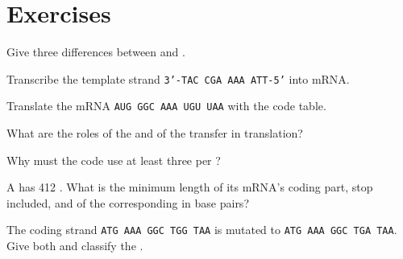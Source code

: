 \section{Exercises}

\begin{exercise}[$\star$]\label{exo:g11:gene-expression:1}
Give three differences between  and .
\end{exercise}

\begin{exercise}[$\star$]\label{exo:g11:gene-expression:2}
Transcribe the template strand \texttt{3'-TAC CGA AAA ATT-5'} into
mRNA.
\end{exercise}

\begin{exercise}[$\star$]\label{exo:g11:gene-expression:3}
Translate the mRNA \texttt{AUG GGC AAA UGU UAA} with the code table.
\end{exercise}

\begin{exercise}[$\star$]\label{exo:g11:gene-expression:4}
What are the roles of the  and of the transfer  in
translation?
\end{exercise}

\begin{exercise}[$\star$]\label{exo:g11:gene-expression:5}
Why must the code use at least three  per ?
\end{exercise}

\begin{exercise}[$\star\star$]\label{exo:g11:gene-expression:6}
A  has 412 . What is the minimum length of its
mRNA's coding part, stop  included, and of the corresponding
 in base pairs?
\end{exercise}

\begin{exercise}[$\star\star$]\label{exo:g11:gene-expression:7}
The coding strand \texttt{ATG AAA GGC TGG TAA} is mutated to
\texttt{ATG AAA GGC TGA TAA}. Give both  and classify the
.
\end{exercise}

